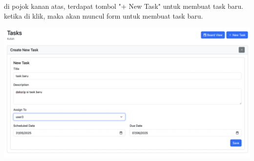 di pojok kanan atas, terdapat tombol "+ New Task" untuk membuat task baru.
ketika di klik, maka akan muncul form untuk membuat task baru.
\begin{center}
  \includegraphics[width=1\textwidth]{assets/ui/list_task_create.png}
\end{center}








